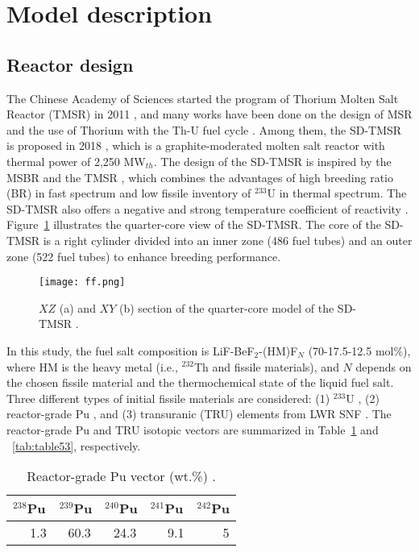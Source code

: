 \section{Model description} \label{Model-description}
\subsection{Reactor design}

The Chinese Academy of Sciences started the program of Thorium Molten Salt Reactor (TMSR) in 2011 \cite{jiang2012advanced}, and many works have been done on the design of MSR and the use of Thorium with the Th-U fuel cycle \cite{li2015analysis}. Among them, the SD-TMSR is proposed in 2018 \cite{li_optimization_2018}, which is a graphite-moderated molten salt reactor with thermal power of 2,250 MW$_{th}$. The design of the SD-TMSR is inspired by the \gls{MSBR} \cite{robertson_conceptual_1971} and the \gls{TMSR} \cite{nuttin2005potential}, which combines the advantages of high breeding ratio (BR) in fast spectrum and low fissile inventory of $^{233}$U in thermal spectrum. The SD-TMSR also offers a negative and strong temperature coefficient of reactivity \cite{li_optimization_2018}. Figure~\ref{fig:ff} illustrates the quarter-core view of the
SD-TMSR. The core of the 
SD-TMSR is a right cylinder divided into an inner zone (486 fuel tubes) 
and an outer zone (522 fuel tubes) to enhance breeding performance.
\begin{figure} %
	\texttt{[image: ff.png]}
	\caption{$XZ$ (a) and $XY$ (b) section of the quarter-core model of the 
		SD-TMSR \cite{ashraf2019Preliminary}.}
	\label{fig:ff}
\end{figure}
In this study, the fuel salt composition is LiF-BeF$_2$-(HM)F$_N$ (70-17.5-12.5 mol\%),
where HM is the heavy metal (i.e., $^{232}$Th and fissile 
materials), and $N$ depends on the chosen fissile material and the 
thermochemical state of the liquid fuel salt. Three different types of initial 
fissile materials are considered: (1) $^{233}$U \cite{ashraf2020whole}, 
(2) reactor-grade Pu \cite{marka1993explosive}, and (3) transuranic (TRU) 
elements from \gls{LWR} \gls{SNF} \cite{de2000scenarios}.
The reactor-grade Pu and TRU isotopic vectors are summarized in 
Table~\ref{tab:table52} and ~\ref{tab:table53}, respectively.

\begin{table} %
	\centering
	\caption{Reactor-grade Pu vector (wt.\%) \cite{marka1993explosive}.}
	\vspace{0.1in}
	\begin{tabularx}{\textwidth}{X X X X X}
		\hline
		$^{238}$Pu & $^{239}$Pu & $^{240}$Pu & $^{241}$Pu & $^{242}$Pu \\
		\hline
		$ $ $ $ $ $ $ $ $ $1.3 &$ $ $ $ $ $60.3&$ $ $ $ $ $24.3&$ $ $ $ $ $ $ $ $ $9.1&$ $ $ $ $ $ $ $ $ $ $ $ $ $5 \\
		\hline
	\end{tabularx}
	\label{tab:table52}
\end{table}

